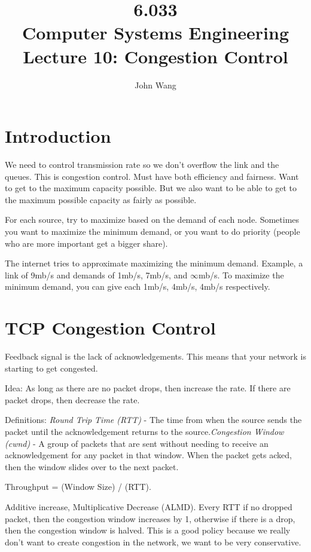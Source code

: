 \documentclass[psamsfonts]{amsart}
\title{6.033 \\
Computer Systems Engineering \\
Lecture 10: Congestion Control}
\author{John Wang}
\begin{document}
\maketitle

\section{Introduction}

We need to control transmission rate so we don't overflow the link and the queues. This is congestion control. Must have both efficiency and fairness.
Want to get to the maximum capacity possible. But we also want to be able to get to the maximum possible capacity as fairly as possible.

For each source, try to maximize based on the demand of each node. Sometimes you want to maximize the minimum demand, or you want to do priority (people who are more important get a bigger share).

The internet tries to approximate maximizing the minimum demand. Example, a link of 9mb/s and demands of 1mb/s, 7mb/s, and $\infty$mb/s. To maximize the minimum demand, you can give each 1mb/s, 4mb/s, 4mb/s respectively.

\section{TCP Congestion Control}

Feedback signal is the lack of acknowledgements. This means that your network is starting to get congested.

Idea: As long as there are no packet drops, then increase the rate. If there are packet drops, then decrease the rate.

Definitions: \emph{Round Trip Time (RTT)} - The time from when the source sends the packet until the acknowledgement returns to the source.\emph{Congestion Window (cwnd)} - A group of packets that are sent without needing to receive an acknowledgement for any packet in that window. When the packet gets acked, then the window slides over to the next packet.

Throughput = (Window Size) / (RTT).

Additive increase, Multiplicative Decrease (ALMD). Every RTT if no dropped packet, then the congestion window increases by 1, otherwise if there is a drop, then the congestion window is halved. This is a good policy because we really don't want to create congestion in the network, we want to be very conservative.
\end{document}
